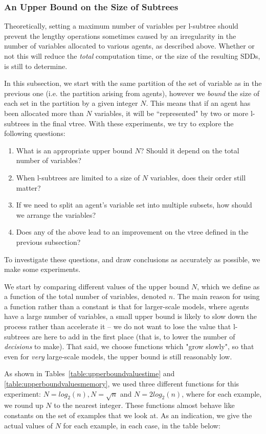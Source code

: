 \documentclass[11pt]{article}
\begin{document}
\subsubsection{An Upper Bound on the Size of Subtrees}

Theoretically, setting a maximum number of variables per l-subtree should prevent the lengthy operations sometimes caused by an irregularity in the number of variables allocated to various agents, as described above. Whether or not this will reduce the \textit{total} computation time, or the size of the resulting SDDs, is still to determine. 

In this subsection, we start with the same partition of the set of variable as in the previous one (i.e. the partition arising from agents), however we \textit{bound }the size of each set in the partition by a given integer $N$. This means that if an agent has been allocated more than $N$ variables, it will be ``represented" by two or more l-subtrees in the final vtree.
With these experiments, we try to explore the following questions:\begin{enumerate}
\item What is an appropriate upper bound $N$? Should it depend on the total number of variables?
\item When l-subtrees are limited to a size of $N$ variables, does their order still matter?
\item If we need to split an agent's variable set into multiple subsets, how should we arrange the variables? 
\item Does any of the above lead to an improvement on the vtree defined in the previous subsection?
\end{enumerate}
To investigate these questions, and draw conclusions as accurately as possible, we make some experiments.

We start by comparing different values of the upper bound $N$, which we define as a function of the total number of variables, denoted $n$. The main reason for using a function rather than a constant is that for larger-scale models, where agents have a large number of variables, a small upper bound is likely to slow down the process rather than accelerate it -- we do not want to lose the value that l-subtrees are here to add in the first place (that is, to lower the number of \textit{decisions} to make). That said, we choose functions which "grow slowly", so that even for \textit{very }large-scale models, the upper bound is still reasonably low. 

As shown in Tables~\ref{table:upperboundvaluestime} and \ref{table:upperboundvaluesmemory}, we used three different functions for this experiment: $N = log_2(n), N = \sqrt{n}$ and  $N = 2log_2(n)$, where for each example, we round up $N$ to the nearest integer. These functions almost behave like constants on the set of examples that we look at. As an indication, we give the actual values of $N$ for each example, in each case, in the table below: \\
\end{document}

